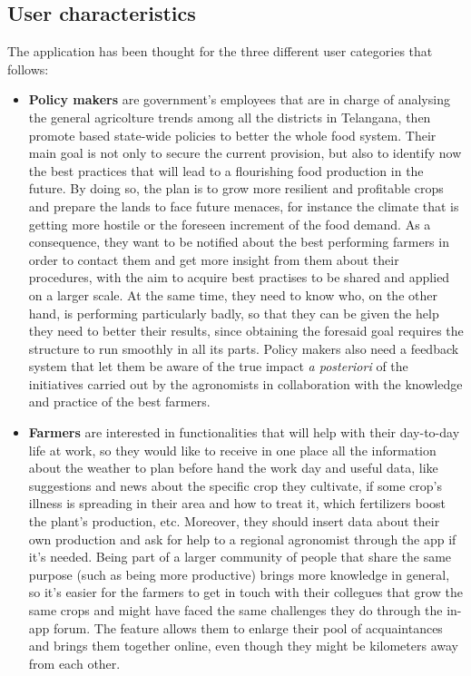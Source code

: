 \documentclass[table, 12pt]{article}
\begin{document}
\subsection{User characteristics}
The application has been thought for the three different user categories that follows:
\begin{itemize}
    \item \textbf{Policy makers} are government's employees that are in charge of analysing the general agricolture trends among all the districts in Telangana, then promote based state-wide policies to better the whole food system. Their main goal is not only to secure the current provision, but also to identify now the best practices that will lead to a flourishing food production in the future. By doing so, the plan is to grow more resilient and profitable crops and prepare the lands to face future menaces, for instance the climate that is getting more hostile or the foreseen increment of the food demand. As a consequence, they want to be notified about the best performing farmers in order to contact them and get more insight from them about their procedures, with the aim to acquire best practises to be shared and applied on a larger scale. At the same time, they need to know who, on the other hand, is performing particularly badly, so that they can be given the help they need to better their results, since obtaining the foresaid goal requires the structure to run smoothly in all its parts. 
    Policy makers also need a feedback system that let them be aware of the true impact \textit{a posteriori} of the initiatives carried out by the agronomists in collaboration with the knowledge and practice of the best farmers.
    \item \textbf{Farmers} are interested in functionalities that will help with their day-to-day life at work, so they would like to receive in one place all the information about the weather to plan before hand the work day and useful data, like suggestions and news about the specific crop they cultivate, if some crop's illness is spreading in their area and how to treat it, which fertilizers boost the plant's production, etc. Moreover, they should insert data about their own production and ask for help to a regional agronomist through the app if it's needed. Being part of a larger community of people that share the same purpose (such as being more productive) brings more knowledge in general, so it's easier for the farmers to get in touch with their collegues that grow the same crops and might have faced the same challenges they do through the in-app forum. The feature allows them to enlarge their pool of acquaintances and brings them together online, even though they might be kilometers away from each other.

\end{itemize}
\end{document}
